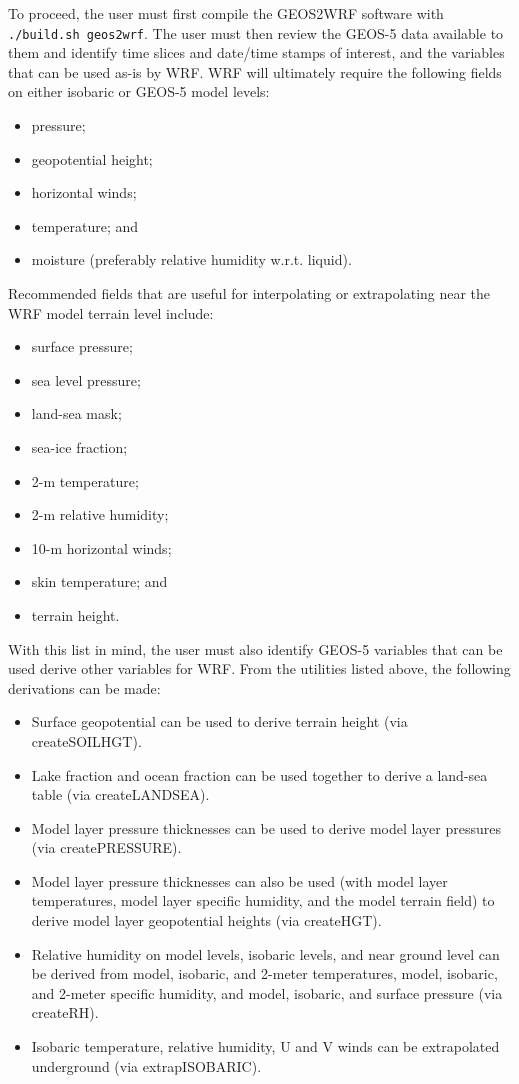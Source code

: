 To proceed, the user must first compile the GEOS2WRF software with
\texttt{./build.sh geos2wrf}. The user must then review the GEOS-5 data 
available to them and identify time slices and date/time stamps of interest, 
and the variables that can be used as-is by WRF. WRF will ultimately require 
the following fields on either isobaric or GEOS-5 model levels:
\begin{itemize}
\item pressure;
\item geopotential height;
\item horizontal winds;
\item temperature; and
\item moisture (preferably relative humidity w.r.t. liquid).
\end{itemize}

Recommended fields that are useful for interpolating or extrapolating near
the WRF model terrain level include:
\begin{itemize}
\item surface pressure;
\item sea level pressure;
\item land-sea mask;
\item sea-ice fraction;
\item 2-m temperature;
\item 2-m relative humidity;
\item 10-m horizontal winds;
\item skin temperature; and
\item terrain height.
\end{itemize}

With this list in mind, the user must also identify GEOS-5 variables that
can be used derive other variables for WRF. From the utilities listed above,
the following derivations can be made:

\begin{itemize}
\item Surface geopotential can be used to derive terrain height (via 
  createSOILHGT).
\item  Lake fraction and ocean fraction can be used together to derive a 
  land-sea table (via createLANDSEA).
\item Model layer pressure thicknesses can be used to derive model layer 
  pressures (via createPRESSURE).
\item Model layer pressure thicknesses can also be used (with model layer 
  temperatures, model layer specific humidity, and the model terrain field) to
  derive model layer geopotential heights (via createHGT).
\item Relative humidity on model levels, isobaric levels, and near ground level
  can be derived from model, isobaric, and 2-meter temperatures, 
  model, isobaric, and 2-meter specific humidity, and model, isobaric, and
  surface pressure (via createRH).
\item Isobaric temperature, relative humidity, U and V winds can be 
  extrapolated underground (via extrapISOBARIC).
\end{itemize}

